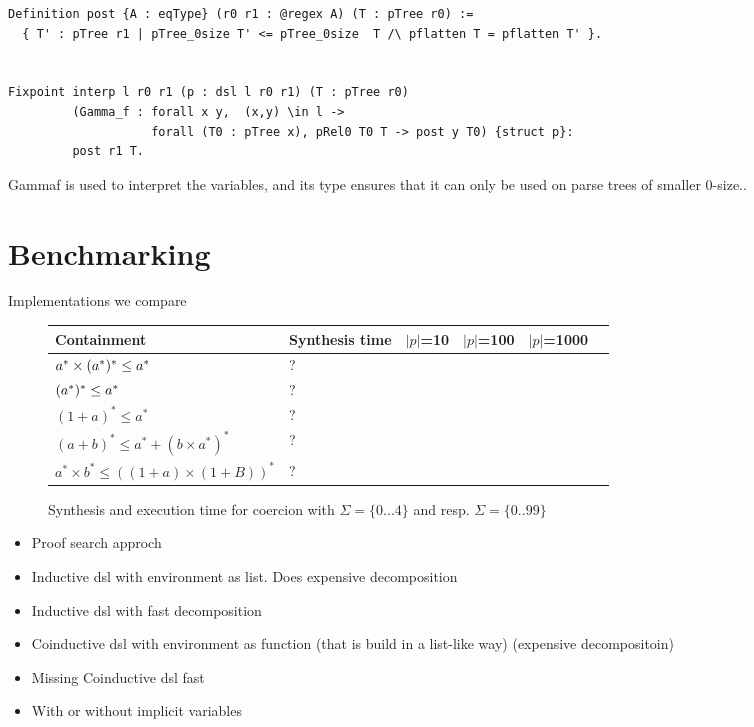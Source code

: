 \documentclass[a4paper,UKenglish,cleveref, autoref, thm-restate]{lipics-v2021}
\newcommand\mycomment[1]{}
\begin{document}
\begin{verbatim}
Definition post {A : eqType} (r0 r1 : @regex A) (T : pTree r0) := 
  { T' : pTree r1 | pTree_0size T' <= pTree_0size  T /\ pflatten T = pflatten T' }. 


Fixpoint interp l r0 r1 (p : dsl l r0 r1) (T : pTree r0) 
         (Gamma_f : forall x y,  (x,y) \in l -> 
                    forall (T0 : pTree x), pRel0 T0 T -> post y T0) {struct p}:
         post r1 T. 
\end{verbatim}
\mycomment{change semantic rules to include environment}
\textsf{Gammaf} is used to interpret the variables, and its type ensures that it can only be used on parse trees of smaller $0$-size..
\section{Benchmarking}
Implementations we compare\\
\begin{figure}
  \centering
  \begin{tabular}{l | l | l | l | l | l}
Containment & Synthesis time & $|p|$=10 &  $|p|$=100 &  $|p|$=1000 \\
\hline
$a^* \times ({a^*})^* \leq a^*$ & ? & & &\\
\hline
$({a^*})^* \leq a^*$ & ? & & &\\
\hline
$(1 + a)^* \leq a^*$ & ? & & &\\
\hline
$(a+b)^* \leq a^* + (b \times a^*)^*$ & ? & & &\\
\hline
$a^* \times b^* \leq ((1 + a) \times (1+ B))^*$ & ? & & &
\end{tabular}
  \caption{Synthesis and execution time for coercion with $\Sigma=\{0...4\}$ and resp. $\Sigma=\{0..99\}$}
  \label{fig:bench}
\end{figure}

\begin{itemize}
\item Proof search approch
\item Inductive dsl with environment as list. Does expensive decomposition
\item Inductive dsl with fast decomposition
\item Coinductive dsl with environment as function (that is build in a list-like way) (expensive decompositoin)
\item Missing Coinductive dsl fast
\item With or without implicit variables
\end{itemize}
\end{document}
